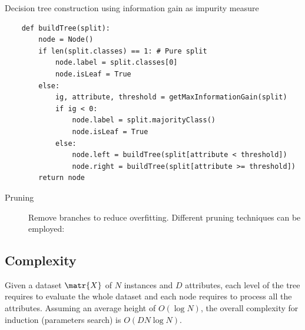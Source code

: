 \begin{algorithm}[H]
\caption{Decision tree construction using information gain as impurity measure}
\begin{lstlisting}
    def buildTree(split):
        node = Node()
        if len(split.classes) == 1: # Pure split
            node.label = split.classes[0]
            node.isLeaf = True
        else:
            ig, attribute, threshold = getMaxInformationGain(split)
            if ig < 0:
                node.label = split.majorityClass()
                node.isLeaf = True
            else:
                node.left = buildTree(split[attribute < threshold])
                node.right = buildTree(split[attribute >= threshold])
        return node
\end{lstlisting}
\end{algorithm}

\begin{description}
    \item[Pruning] 
        Remove branches to reduce overfitting.
        Different pruning techniques can be employed:
\end{description}


\subsection{Complexity}
Given a dataset $\matr{X}$ of $N$ instances and $D$ attributes,
each level of the tree requires to evaluate the whole dataset and
each node requires to process all the attributes.
Assuming an average height of $O(\log N)$, 
the overall complexity for induction (parameters search) is $O(DN \log N)$.

